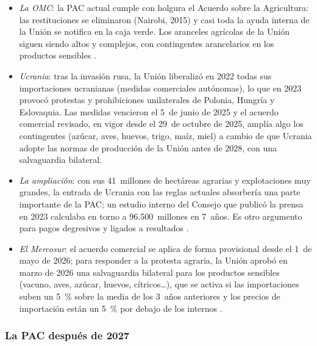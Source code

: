 \documentclass[11pt]{article}
\begin{document}
\begin{itemize}
\item \emph{La OMC}: la PAC actual cumple con holgura el Acuerdo sobre la Agricultura: las restituciones se eliminaron (Nairobi, 2015) y casi toda la ayuda interna de la Unión se notifica en la caja verde. Los aranceles agrícolas de la Unión siguen siendo altos y complejos, con contingentes arancelarios en los productos sensibles  .
\item \emph{Ucrania}: tras la invasión rusa, la Unión liberalizó en 2022 todas sus importaciones ucranianas (medidas comerciales autónomas), lo que en 2023 provocó protestas y prohibiciones unilaterales de Polonia, Hungría y Eslovaquia. Las medidas vencieron el 5~de junio de 2025 y el acuerdo comercial revisado, en vigor desde el 29~de octubre de 2025, amplía algo los contingentes (azúcar, aves, huevos, trigo, maíz, miel) a cambio de que Ucrania adopte las normas de producción de la Unión antes de 2028, con una salvaguardia bilateral\nocite{CE2025Ucrania}.
\item \emph{La ampliación}: con sus 41~millones de hectáreas agrarias y explotaciones muy grandes, la entrada de Ucrania con las reglas actuales absorbería una parte importante de la PAC; un estudio interno del Consejo que publicó la prensa en 2023 calculaba en torno a 96.500~millones en 7~años. Es otro argumento para pagos degresivos y ligados a resultados .
\item \emph{El Mercosur}: el acuerdo comercial se aplica de forma provisional desde el 1~de mayo de 2026; para responder a la protesta agraria, la Unión aprobó en marzo de 2026 una salvaguardia bilateral para los productos sensibles (vacuno, aves, azúcar, huevos, cítricos\ldots), que se activa si las importaciones suben un 5~\% sobre la media de los 3~años anteriores y los precios de importación están un 5~\% por debajo de los internos\nocite{PE2026Salvaguardia} .
\end{itemize}

\subsubsection{La PAC después de 2027}\label{sec:pac-2028}
\end{document}
